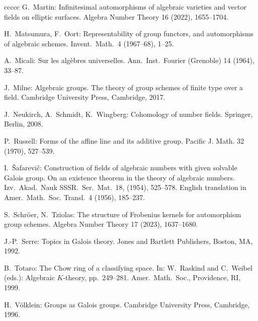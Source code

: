 \documentclass[oneside, 12pt]{amsart}
\theoremstyle{definition}
\theoremstyle{remark}
\begin{document}
\begin{thebibliography}{ccccc}
G.\ Martin:
Infinitesimal automorphisms of algebraic varieties 
and vector fields on elliptic surfaces.
Algebra Number Theory 16 (2022),  1655--1704. 

H.\ Matsumura, F.\ Oort:
Representability of group functors, and automorphisms of algebraic schemes.
Invent.\ Math.\ 4 (1967--68), 1--25. 

A.\ Micali:
Sur les algèbres universelles.
Ann.\ Inst.\ Fourier (Grenoble) 14 (1964), 33--87.

J.\ Milne:
Algebraic groups. The theory of group schemes
of finite type over a field.
Cambridge University Press, Cambridge, 2017.

J.\ Neukirch, A.\  Schmidt, K.\ Wingberg:
Cohomology of number fields. 
Springer, Berlin, 2008.

P.\ Russell:
Forms of the affine line and its additive group.
Pacific J. Math. 32 (1970), 527--539.

I.\ \v{S}afarevi\v{c}:
Construction of fields of algebraic numbers with given solvable Galois group. 
On an existence theorem in the theory of algebraic numbers.  
Izv.\ Akad.\ Nauk SSSR.\ Ser.\ Mat.\ 18, (1954), 525--578. 
English translation in Amer.\ Math.\ Soc. Transl.\ 4 (1956), 185--237.

S.\ Schr\"oer, N.\ Tziolas:
The structure of Frobenius kernels for automorphism group schemes.
Algebra Number Theory 17 (2023),  1637--1680. 

J.-P.\ Serre:
Topics in Galois theory.
Jones and Bartlett Publishers, Boston, MA, 1992.
 
B.\ Totaro:
The Chow ring of a classifying space. 
In: 
W.\ Raskind and C.\ Weibel (eds.): Algebraic $K$-theory, pp.\ 249--281.
Amer.\ Math.\ Soc., Providence, RI, 1999. 

H.\ V\"olklein:
Groups as Galois groups.
Cambridge University Press, Cambridge, 1996.

\end{thebibliography}
\end{document}
